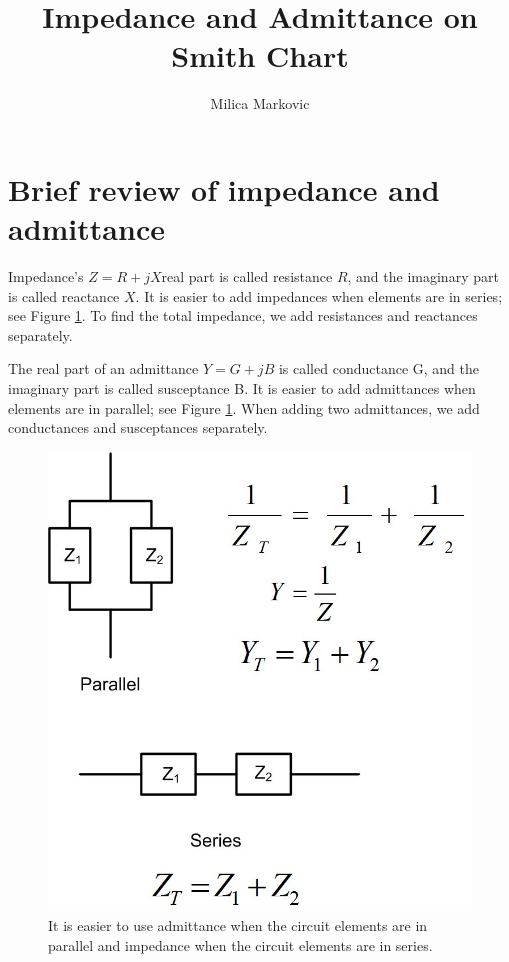 \documentclass{ximera}
\title{Impedance and Admittance on Smith Chart}
\author{Milica Markovic}
\begin{document}
  
\begin{abstract}  

\end{abstract}  
\maketitle    




\section{Brief review of impedance and admittance}

Impedance's $Z =R+jX$real part is called resistance $R$, and the imaginary part is called reactance $X$. It is easier to add impedances when elements are in series; see Figure \ref{fig:SCDerimpadmtrans}. To find the total impedance, we add resistances and reactances separately. 

 The real part of an admittance $Y=G+jB$  is called conductance G, and the imaginary part is called susceptance B. It is easier to add admittances when elements are in parallel; see Figure \ref{fig:SCDerimpadmtrans}. When adding two admittances, we add conductances and susceptances separately.  
 
\begin{figure}[htbp]
\begin{center}
\includegraphics[scale=0.25]{../jpg/Impedance_Admittance.jpg}
\end{center}
\caption{It is easier to use admittance when the circuit elements are in parallel and impedance when the circuit elements are in series.}
\label{fig:SCDerimpadmtrans}
\end{figure}
\end{document}
